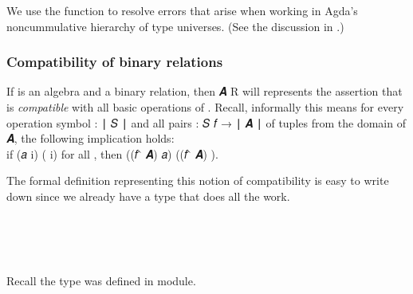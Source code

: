 \ccpad
We use the function  to resolve errors that arise when working in Agda's noncummulative hierarchy of type universes. (See the discussion in \ualibLifts.)

\subsubsection{Compatibility of binary relations}\label{compatibility-of-binary-relations}

If  is an algebra and  a binary relation, then  \ab 𝑨 \ab R will represents the assertion that  is \emph{compatible} with all basic operations of . Recall, informally this means for every operation symbol  \as : \af ∣ \ab 𝑆 \af ∣ and all pairs  \as :  \ab 𝑆  \ab 𝑓 \as → \af ∣ \ab 𝑨 \af ∣ of tuples from the domain of \ab 𝑨, the following implication holds:\\[4pt]
if  (\ab 𝑎 \ab i) ( \ab i) for all , then  ((\ab 𝑓 \af ̂ \ab 𝑨) \ab 𝑎) ((\ab 𝑓 \af ̂ \ab 𝑨) ).

The formal definition representing this notion of compatibility is easy to write down since we already have a type that does all the work.
\ccpad
\begin{code}%
\>[0]\AgdaSpace{}%
\AgdaModule{\AgdaUnderscore{}}\AgdaSpace{}%
\AgdaSymbol{\{}\AgdaSpace{}%
\AgdaSpace{}%
\AgdaSymbol{:}\AgdaSpace{}%
\AgdaSymbol{\}}\AgdaSpace{}%
\AgdaSymbol{\{}\AgdaSpace{}%
\AgdaSymbol{:}\AgdaSpace{}%
\AgdaSpace{}%
\AgdaSpace{}%
\AgdaSymbol{\}}\AgdaSpace{}%
\<%
\\
%
\\[\AgdaEmptyExtraSkip]%
\>[0][@{}l@{\AgdaIndent{0}}]%
\>[1]\AgdaSpace{}%
\AgdaSymbol{:}\AgdaSpace{}%
\AgdaSymbol{(}\AgdaSpace{}%
\AgdaSymbol{:}\AgdaSpace{}%
\AgdaSpace{}%
\AgdaSpace{}%
\AgdaSymbol{)}\AgdaSpace{}%
\AgdaSpace{}%
\AgdaSpace{}%
\AgdaSpace{}%
\AgdaSpace{}%
\AgdaSpace{}%
\AgdaSpace{}%
\AgdaSpace{}%
\AgdaSpace{}%
\AgdaSpace{}%
\AgdaSpace{}%
\AgdaSpace{}%
\AgdaSpace{}%
\AgdaSpace{}%
\AgdaSpace{}%
\<%
\\
%
\>[1]%
\>[13]\AgdaSpace{}%
\AgdaSpace{}%
\AgdaSymbol{=}\AgdaSpace{}%
\AgdaSpace{}%
\AgdaSpace{}%
\AgdaSpace{}%
\AgdaSpace{}%
\AgdaSymbol{(}\AgdaSpace{}%
\AgdaSpace{}%
\AgdaSymbol{)}\AgdaSpace{}%
\<%
\end{code}
\ccpad
Recall the  type was defined in \ualibDiscrete module.

